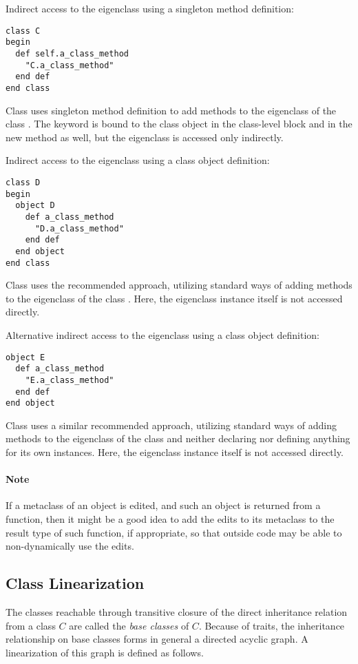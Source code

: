 \example Indirect access to the eigenclass using a singleton method definition:
\begin{lstlisting}
class C
begin
  def self.a_class_method
    "C.a_class_method"
  end def
end class
\end{lstlisting}
Class  uses singleton method definition to add methods to the eigenclass of the class . The keyword  is bound to the class object in the class-level block and in the new method as well, but the eigenclass is accessed only indirectly. 

\example Indirect access to the eigenclass using a class object definition:
\begin{lstlisting}
class D
begin
  object D
    def a_class_method
      "D.a_class_method"
    end def
  end object
end class
\end{lstlisting}
Class  uses the recommended approach, utilizing standard ways of adding methods to the eigenclass of the class . Here, the eigenclass instance itself is not accessed directly.  

\example Alternative indirect access to the eigenclass using a class object definition:
\begin{lstlisting}
object E
  def a_class_method
    "E.a_class_method"
  end def
end object
\end{lstlisting}
Class  uses a similar recommended approach, utilizing standard ways of adding methods to the eigenclass of the class  and neither declaring nor defining anything for its own instances. Here, the eigenclass instance itself is not accessed directly. 

\paragraph{Note}
If a metaclass of an object is edited, and such an object is returned from a function, then it might be a good idea to add the edits to its metaclass to the result type of such function, if appropriate, so that outside code may be able to non-dynamically use the edits. 





\subsection{Class Linearization}
\label{sec:class-linearization}

The classes reachable through transitive closure of the direct inheritance relation from a class $C$ are called the {\em base classes} of $C$. Because of traits, the inheritance relationship on base classes forms in general a directed acyclic graph. A linearization of this graph is defined as follows. 

